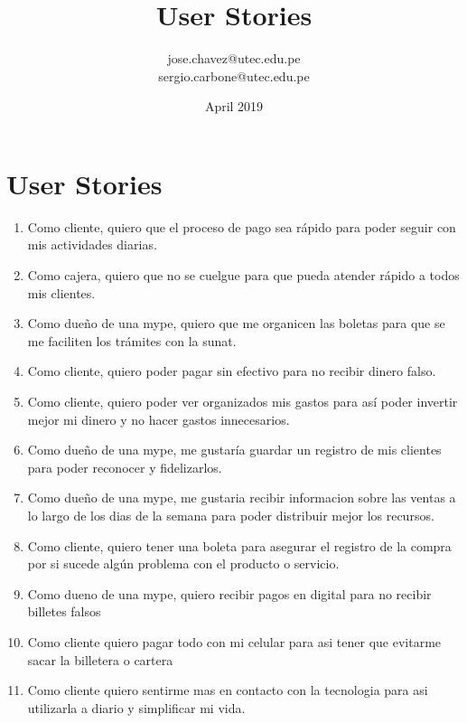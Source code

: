 \documentclass{article}
\title{User Stories}
\author{jose.chavez@utec.edu.pe\\sergio.carbone@utec.edu.pe }
\date{April 2019}
\begin{document}
\maketitle

\section{User Stories}
\begin{enumerate}

    \item Como cliente, quiero que el proceso de pago sea rápido para poder seguir con mis actividades diarias.
    \item Como cajera, quiero que no se cuelgue para que pueda atender rápido a todos mis clientes.
    \item Como dueño de una mype, quiero que me organicen las boletas para que se me faciliten los trámites con la sunat.
    \item Como cliente, quiero poder pagar sin efectivo para no recibir dinero falso.  
    \item Como cliente, quiero poder ver organizados mis gastos para así poder invertir mejor mi dinero y no hacer gastos innecesarios.
    \item Como dueño de una mype, me gustaría guardar un registro de mis clientes para poder reconocer y fidelizarlos.
    \item Como dueño de una mype, me gustaria recibir informacion sobre las ventas a lo largo de los dias de la semana para poder distribuir mejor los recursos.
    \item Como cliente, quiero tener una boleta para asegurar el registro de la compra por si sucede algún problema con el producto o servicio.
    \item Como dueno de una mype, quiero recibir pagos en digital para no recibir billetes falsos
    \item Como cliente quiero pagar todo con mi celular para asi tener que evitarme sacar la billetera o cartera
    \item Como cliente quiero sentirme mas en contacto con la tecnologia para asi utilizarla a diario y simplificar mi vida.
    
\end{enumerate}
\end{document}
